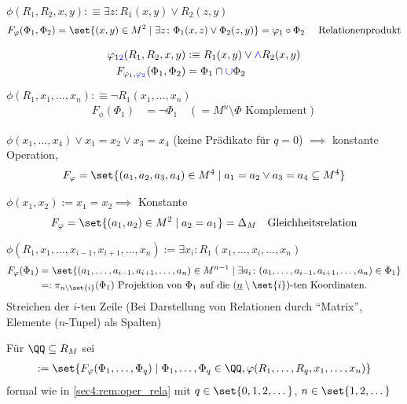 \begin{example}
	\begin{expenum}
		\item $\phi(R_1, R_2, x,y) :\equiv \exists z \colon R_1(x,y) \vee R_2(z,y)$
		\begin{align*}
			F_{\phi}(\Phi_1,\Phi_2) = \set{(x,y) \in M^2 \mid \exists z \colon \Phi_1(x,z) \vee \Phi_2(z,y)} = \phi_1 \circ \Phi_2 \quad \text{ Relationenprodukt}
		\end{align*}
		\item \begin{align*}
			\varphi_{1\textcolor{blue}{2}}(R_1,R_2,x,y) &:\equiv R_1(x,y) \vee \textcolor{blue}{\wedge} R_2(x,y)\\
			F_{\varphi_1, \textcolor{blue}{\varphi_2}}(\Phi_1, \Phi_2) &= \Phi_1 \cap \textcolor{blue}{\cup} \Phi_2
		\end{align*}
		\item $\phi(R_1, x_1, \dots, x_n) :\equiv \neg R_1(x_1, \dots, x_n)$
		\begin{align*}
			F_{\phi}(\Phi_1)&=\neg \Phi_1 \quad (=M^n \setminus \Phi \text{ Komplement})
		\end{align*}
		\item $\phi(x_1, \dots, x_4) \vee x_1 = x_2 \vee x_3 = x_4$ (keine Prädikate für $q=0$) $\implies$ konstante Operation, 
		\begin{align*}
			F_{\phi} = \set{(a_1,a_2,a_3, a_4) \in M^4 \mid a_1 = a_2 \vee a_3 = a_4 \subseteq M^4}
		\end{align*}
		\item $\phi(x_1, x_2) := x_1 = x_2 \implies$ Konstante
		\begin{align*}
			F_{\phi} = \set{(a_1, a_2) \in M^2 \mid a_2 = a_1} = \Delta_M \quad \text{Gleichheitsrelation}
		\end{align*}
		\item $\phi(R_1, x_1, \dots, x_{i-1}, x_{i+1}, \dots, x_n) := \exists x_i \colon R_1(x_1, \dots, x_i, \dots, x_n)$
		\begin{align*}
			F_{\phi}(\Phi_1) &= \set{(a_1, \dots, a_{i-1}, a_{i+1},\dots, a_n) \in M^{n-1} \mid \exists a_i \colon (a_1, \dots, a_{i-1}, a_{i+1}, \dots, a_n) \in \Phi_1}\\
			&=: \pi_{n \setminus \set{i}}(\Phi_1) \text{ Projektion von $\Phi_1$ auf die $(\ul{n}\setminus \set{i})$-ten Koordinaten.}
		\end{align*}
		Streichen der $i$-ten Zeile (Bei Darstellung von Relationen durch ``Matrix'', Elemente ($n$-Tupel) als Spalten)
	\end{expenum}
\end{example}
\begin{definition}
	Für $\QQ \subseteq R_M$ sei
	\begin{align*}
		[\QQ] := \set{F_{\phi}(\Phi_1, \dots, \Phi_q)\mid \Phi_1, \dots, \Phi_q \in \QQ, \phi(R_1, \dots, R_q, x_1, \dots, x_n)}
	\end{align*}
	formal wie in \cref{sec4:rem:oper_rela} mit $q \in \set{0,1,2, \dots}$, $n \in \set{1,2,\dots}$
\end{definition}
